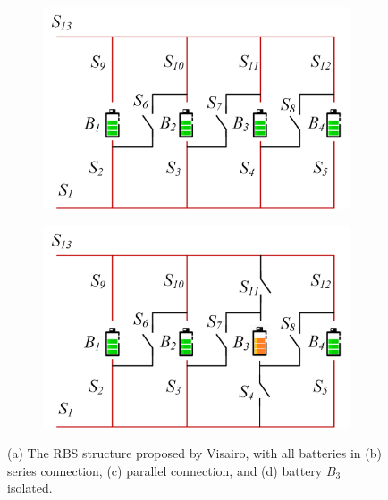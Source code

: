 \documentclass{article}
\providecommand{\DIFaddbeginFL}{} %
\providecommand{\DIFaddendFL}{} %
\providecommand{\DIFdelbeginFL}{} %
\providecommand{\DIFdelendFL}{} %
\newcommand{\DIFscaledelfig}{0.5}
\newlength{\DIFdelgraphicswidth} %
\newlength{\DIFdelgraphicsheight} %
\newcommand{\DIFaddincludegraphics}[2][]{{\color{blue}\fbox{\DIFOincludegraphics[#1]{#2}}}} %
\newcommand{\DIFdelincludegraphics}[2][]{%
\sbox{\DIFdelgraphicsbox}{\DIFOincludegraphics[#1]{#2}}%
\settoboxwidth{\DIFdelgraphicswidth}{\DIFdelgraphicsbox} %
\settoboxtotalheight{\DIFdelgraphicsheight}{\DIFdelgraphicsbox} %
\scalebox{\DIFscaledelfig}{%
\parbox[b]{\DIFdelgraphicswidth}{\usebox{\DIFdelgraphicsbox}\\[-\baselineskip] \rule{\DIFdelgraphicswidth}{0em}}\llap{\resizebox{\DIFdelgraphicswidth}{\DIFdelgraphicsheight}{%
\setlength{\unitlength}{\DIFdelgraphicswidth}%
\begin{picture}(1,1)%
\thicklines\linethickness{2pt} %
{\color[rgb]{1,0,0}\put(0,0){\framebox(1,1){}}}%
{\color[rgb]{1,0,0}\put(0,0){\line( 1,1){1}}}%
{\color[rgb]{1,0,0}\put(0,1){\line(1,-1){1}}}%
\end{picture}%
}\hspace*{3pt}}} %
} %
\DeclareRobustCommand{\DIFaddbeginFL}{\DIFOaddbeginFL \let\includegraphics\DIFaddincludegraphics} %
\DeclareRobustCommand{\DIFaddendFL}{\DIFOaddendFL \let\includegraphics\DIFOincludegraphics} %
\DeclareRobustCommand{\DIFdelbeginFL}{\DIFOdelbeginFL \let\includegraphics\DIFdelincludegraphics} %
\DeclareRobustCommand{\DIFdelendFL}{\DIFOaddendFL \let\includegraphics\DIFOincludegraphics} %
\begin{document}
\begin{figure}[htbp]
    \begin{subfigure}[b]{0.45\textwidth}
        \DIFdelbeginFL %
\DIFdelendFL \DIFaddbeginFL \includegraphics[width=\textwidth]{stru-V-parallel.png}
        \DIFaddendFL \caption{}
        \label{fig:stru-Visairo-parallel}
    \end{subfigure}
    \hspace{0.05\textwidth}
    \begin{subfigure}[b]{0.45\textwidth}
        \DIFdelbeginFL %
\DIFdelendFL \DIFaddbeginFL \includegraphics[width=\textwidth]{stru-V-isolate.png}
        \DIFaddendFL \caption{}
        \label{fig:stru-Visairo-isolate}
    \end{subfigure}
    \caption{
        (a) The RBS structure proposed by Visairo\cite{visairoReconfigurableBatteryPack2008}, with
        all batteries in (b) series connection, (c) parallel connection, and
        (d) battery $B_3$ isolated.
        }
    \label{fig:arch}
\end{figure}
\end{document}
